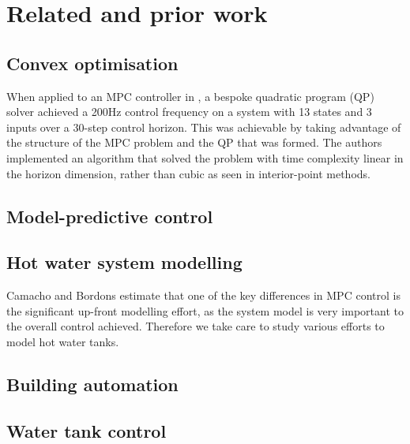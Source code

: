 \chapter{Related and prior work}

\section{Convex optimisation}

When applied to an MPC controller in \cite{Wang10}, a bespoke quadratic program (QP) solver achieved a 200Hz control frequency on a system with 13 states and 3 inputs over a 30-step control horizon.
This was achievable by taking advantage of the structure of the MPC problem and the QP that was formed.
The authors implemented an algorithm that solved the problem with time complexity linear in the horizon dimension, rather than cubic as seen in interior-point methods.


\section{Model-predictive control}


\section{Hot water system modelling}

Camacho and Bordons estimate that one of the key differences in MPC control is the significant up-front modelling effort, as the system model is very important to the overall control achieved.
Therefore we take care to study various efforts to model hot water tanks.


\section{Building automation}


\section{Water tank control}

